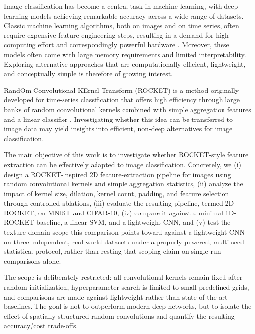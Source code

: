 \documentclass[a4paper,fleqn]{cas-sc}
\begin{document}
Image classification has become a central task in machine learning, with deep learning models achieving remarkable accuracy across a wide range of datasets. Classic machine learning algorithms, both on images and on time series, often require expensive feature-engineering steps, resulting in a demand for high computing effort and correspondingly powerful hardware \citep{ismailfawaz2019deep}. Moreover, these models often come with large memory requirements and limited interpretability. Exploring alternative approaches that are computationally efficient, lightweight, and conceptually simple is therefore of growing interest.

RandOm Convolutional KErnel Transform (ROCKET) is a method originally developed for time-series classification that offers high efficiency through large banks of random convolutional kernels combined with simple aggregation features and a linear classifier \citep{dempster2020rocket}. Investigating whether this idea can be transferred to image data may yield insights into efficient, non-deep alternatives for image classification.

The main objective of this work is to investigate whether ROCKET-style feature extraction can be effectively adapted to image classification. Concretely, we (i) design a ROCKET-inspired 2D feature-extraction pipeline for images using random convolutional kernels and simple aggregation statistics, (ii) analyze the impact of kernel size, dilation, kernel count, padding, and feature selection through controlled ablations, (iii) evaluate the resulting pipeline, termed 2D-ROCKET, on MNIST and CIFAR-10, (iv) compare it against a minimal 1D-ROCKET baseline, a linear SVM, and a lightweight CNN, and (v) test the texture-domain scope this comparison points toward against a lightweight CNN on three independent, real-world datasets under a properly powered, multi-seed statistical protocol, rather than resting that scoping claim on single-run comparisons alone.

The scope is deliberately restricted: all convolutional kernels remain fixed after random initialization, hyperparameter search is limited to small predefined grids, and comparisons are made against lightweight rather than state-of-the-art baselines. The goal is not to outperform modern deep networks, but to isolate the effect of spatially structured random convolutions and quantify the resulting accuracy/cost trade-offs.
\end{document}
